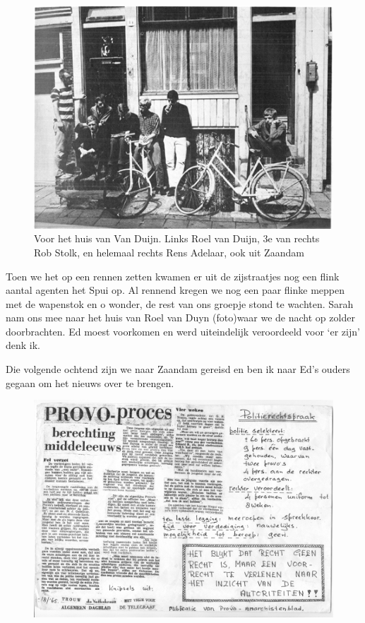 \documentclass[12pt,twoside, openright]{memoir}
\begin{document}
\begin{figure}
\includegraphics[width=\textwidth]{img/ch27/duyn002prov01ill10}
\caption*{\footnotesize Voor het huis van Van Duijn. Links Roel van Duijn, 3e van rechts Rob Stolk, en helemaal rechts Rens Adelaar, ook uit Zaandam}
\end{figure}

Toen we het op een rennen zetten kwamen er uit de zijstraatjes nog een flink aantal agenten het Spui op. Al rennend kregen we nog een paar flinke meppen met de wapenstok en o wonder, de rest van ons groepje stond te wachten. Sarah nam ons mee naar het huis van Roel van Duyn (foto)waar we de nacht op zolder doorbrachten. Ed moest voorkomen en werd uiteindelijk veroordeeld voor ‘er zijn’ denk ik. 


Die volgende ochtend zijn we naar Zaandam gereisd en ben ik naar Ed’s ouders gegaan om het nieuws over te brengen. 


\begin{figure}
\includegraphics[width=\textwidth]{img/ch27/aug65EdE}
\end{figure}
\end{document}
